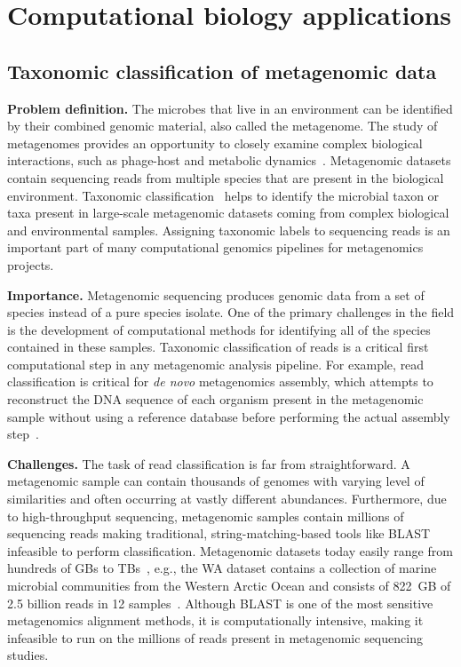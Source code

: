 
\section{Computational biology applications}


\subsection{Taxonomic classification of metagenomic data}

\textbf{Problem definition.}
The microbes that live in an environment can be identified by their combined genomic material, also called the metagenome.
The study of metagenomes provides an opportunity to closely examine complex biological interactions, such as phage-host and metabolic dynamics~\cite{national2007new}.
Metagenomic datasets contain sequencing reads from multiple species that are present in the biological environment.
%
Taxonomic classification~\cite{wood2014kraken} helps to identify the microbial taxon or taxa present in large-scale  metagenomic datasets coming from complex biological and environmental samples. Assigning taxonomic labels to sequencing reads is an important part of many computational genomics pipelines for metagenomics projects.

\noindent
\textbf{Importance.}
Metagenomic sequencing produces genomic data from a set of species instead of a pure species isolate. One of the primary challenges in the field is the development of computational methods for identifying all of the species contained in these samples.
%
Taxonomic classification of reads is a critical first computational step in any metagenomic analysis pipeline.
For example, read classification is critical for \emph{de novo} metagenomics assembly, which attempts to reconstruct the DNA sequence of each organism present in the metagenomic sample without using a reference database before performing the actual assembly step~\cite{venter2004environmental,brady2009phymm,brady2011phymmbl,rosen2008metagenome,segata2012metagenomic}.

\noindent
\textbf{Challenges.}
The task of read classification is far from straightforward.
A metagenomic sample can contain thousands of genomes with varying level of similarities and often occurring at vastly different abundances. Furthermore, due to high-throughput sequencing, metagenomic samples contain millions of sequencing reads making traditional, string-matching-based tools like BLAST~\cite{altschul1990basic} infeasible to perform classification. Metagenomic datasets today easily range from hundreds of GBs to TBs~\cite{hofmeyr2020terabase}, e.g., the WA dataset contains a collection of marine microbial communities from the Western Arctic Ocean and consists of 822~GB of 2.5 billion reads in 12 samples~\cite{hofmeyr2020terabase}.
%
Although BLAST is one of the most sensitive metagenomics alignment methods, it is computationally intensive, making it infeasible to run on the millions of reads present in metagenomic sequencing studies.

